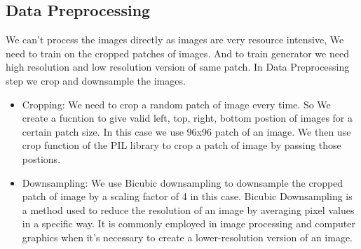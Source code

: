         \subsection{Data Preprocessing}
 We can't process the images directly as images are very resource intensive, We need to train on the cropped patches of images. And to train generator we need high resolution and low resolution version of same patch. In Data Preprocessing step we crop and downsample the images. 
    \begin{itemize}
        \item Cropping: We need to crop a random patch of image every time. So We create a fucntion to give  valid left, top, right, bottom postion of images for a certain patch size. In this case we use 96x96 patch of an image. We then use crop function of the PIL library to crop a patch of image by passing those postions.
        \item Downsampling: We use Bicubic downsampling  to downsample the cropped patch of image by a scaling factor of 4 in this case. Bicubic Downsampling is a method used to reduce the resolution of an image by averaging pixel values in a specific way. It is commonly employed in image processing and computer graphics when it's necessary to create a lower-resolution version of an image.
    \end{itemize}
